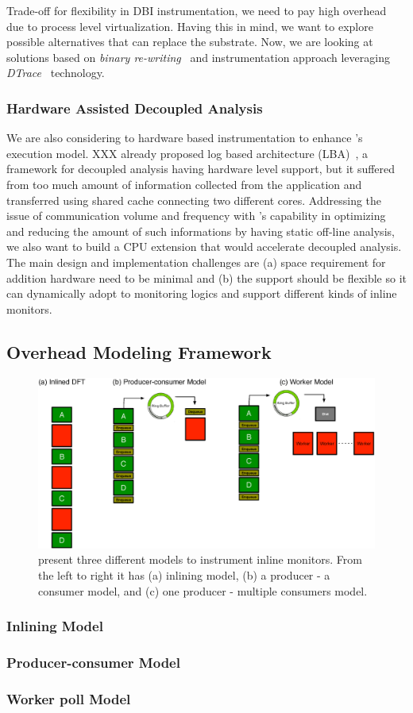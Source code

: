 Trade-off for flexibility in DBI instrumentation, we need to pay high
overhead due to process level virtualization. Having this in mind, we want to
explore possible alternatives that can replace the substrate. Now, we are
looking at solutions based on {\it binary re-writing}~\cite{cfi, rewriting} and
instrumentation approach leveraging {\it DTrace}~\cite{} technology.

\subsubsection{Hardware Assisted Decoupled Analysis} 
\label{}

We are also considering to hardware based instrumentation to enhance
\sreplica's execution model. XXX \etal already proposed log based architecture
(LBA)~\cite{lba}, a framework for decoupled analysis having hardware level
support, but it suffered from too much amount of information collected from the
application and transferred using shared cache connecting two different cores.
%
Addressing the issue of communication volume and frequency with \sreplica's
capability in optimizing and reducing the amount of such informations by having
static off-line analysis, we also want to build a CPU extension that would
accelerate decoupled analysis. 
%
The main design and implementation challenges are (a) space requirement for
addition hardware need to be minimal and (b) the support should be flexible so
it can dynamically adopt to monitoring logics and support different kinds of
inline monitors.

\subsection{Overhead Modeling Framework}

\begin{figure}[tb]
    \centering
    \includegraphics[width=0.90\linewidth]{figs/model0.eps}

    \caption{present three different models to instrument inline monitors. From
    the left to right it has (a) inlining model, (b) a producer - a consumer
    model, and (c) one producer - multiple consumers model.\label{fig:model0}}

\end{figure}

\subsubsection{Inlining Model}
\subsubsection{Producer-consumer Model}
\subsubsection{Worker poll Model}

